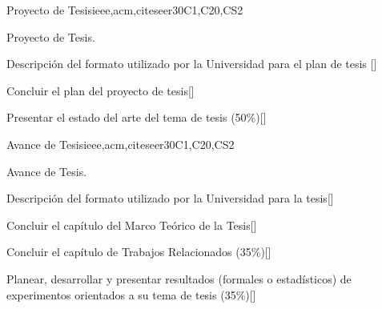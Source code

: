 \begin{syllabus}
\begin{unit}{Proyecto de Tesis}{}{ieee,acm,citeseer}{30}{C1,C20,CS2}
   \begin{topics}
      \item Proyecto de Tesis.
   \end{topics}
   \begin{learningoutcomes}
      \item Descripción del formato utilizado por la Universidad para el plan de tesis [\Assessment]
      \item Concluir el plan del proyecto de tesis[\Assessment]
      \item Presentar el estado del arte del tema de tesis (50\%)[\Assessment]
   \end{learningoutcomes}
\end{unit}

\begin{unit}{Avance de Tesis}{}{ieee,acm,citeseer}{30}{C1,C20,CS2}
   \begin{topics}
      \item Avance de Tesis.
   \end{topics}
   \begin{learningoutcomes}
      \item Descripción del formato utilizado por la Universidad para la tesis[\Assessment]
      \item Concluir el capítulo del Marco Teórico de la Tesis[\Assessment]
      \item Concluir el capítulo de Trabajos Relacionados (35\%)[\Assessment]
      \item Planear, desarrollar y presentar resultados (formales o estadísticos) de experimentos orientados a su tema de tesis (35\%)[\Assessment]
   \end{learningoutcomes}
\end{unit}











\begin{coursebibliography}
\end{coursebibliography}
\end{syllabus}
